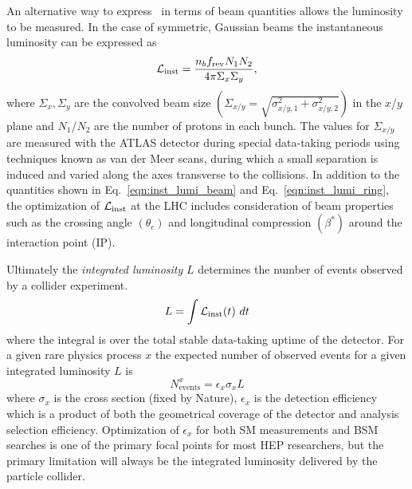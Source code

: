 An alternative way to express \InstLumi\ in terms of beam quantities allows the luminosity to be measured\cite{Grafstrom:2015foa}. In the case of symmetric, Gaussian beams the instantaneous luminosity can be expressed as
\begin{equation}
\mathcal{L}_{\mathrm{inst}} = \frac{n_b f_{\mathrm{rev}} N_1 N_2}{4\pi \Sigma_x \Sigma_y},
\label{eqn:inst_lumi_beam}
\end{equation}
where $\Sigma_x, \Sigma_y$ are the convolved beam size $\left(\Sigma_{x/y} = \sqrt{\sigma_{x/y,1}^2 + \sigma_{x/y,2}^2}\right)$ in the $x$/$y$ plane and $N_1$/$N_2$ are the number of protons in each bunch.
The values for $\Sigma_{x/y}$ are measured with the ATLAS detector during special data-taking periods \cite{ATLAS-CONF-2019-021} using techniques known as van der Meer scans, during which a small separation is induced and varied along the axes transverse to the collisions. In addition to the quantities shown in Eq.~\ref{eqn:inst_lumi_beam} and Eq.~\ref{eqn:inst_lumi_ring}, the optimization of $\mathcal{L}_{\mathrm{inst}}$ at the LHC includes consideration of beam properties such as the crossing angle $(\theta_c)$ and longitudinal compression $(\beta^*)$ around the interaction point (IP).

Ultimately the \textit{integrated luminosity} $L$ determines the number of events observed by a collider experiment.
\begin{equation}
L = \int \mathcal{L}_{\mathrm{inst}}(t)\ dt
\label{eqn:integrated_lumi}
\end{equation}
where the integral is over the total stable data-taking uptime of the detector.
For a given rare physics process $x$ the expected number of observed events for a given integrated luminosity $L$ is
\begin{equation}
N_{\mathrm{events}}^{x} = \epsilon_x \sigma_x L
\label{eqn:nobs_events}
\end{equation}
where $\sigma_x$ is the cross section (fixed by Nature), $\epsilon_x$ is the detection efficiency which is a product of both the geometrical coverage of the detector and analysis selection efficiency.
Optimization of $\epsilon_x$ for both SM measurements and BSM searches is one of the primary focal points for most HEP researchers, but the primary limitation will always be the integrated luminosity delivered by the particle collider.

